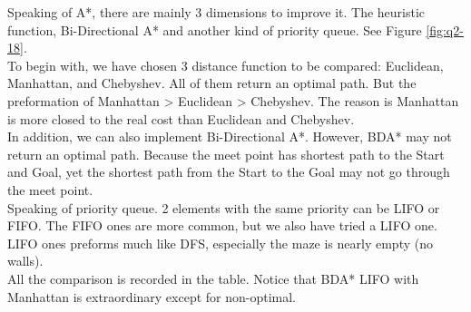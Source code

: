 \documentclass[letter]{article}
\begin{document}
\begin{questions}
	Speaking of A*, there are mainly 3 dimensions to improve it. The heuristic function, Bi-Directional A* and another kind of priority queue. See Figure \ref{fig:q2-18}.\\
	
	To begin with, we have chosen 3 distance function to be compared: Euclidean, Manhattan, and Chebyshev. All of them return an optimal path. But the preformation of Manhattan > Euclidean > Chebyshev. The reason is Manhattan is more closed to the real cost than Euclidean and Chebyshev. \\
	
	In addition, we can also implement Bi-Directional A*. However, BDA* may not return an optimal path. Because the meet point has shortest path to the Start and Goal, yet the shortest path from the Start to the Goal may not go through the meet point. \\
	
	Speaking of priority queue. 2 elements with the same priority can be LIFO or FIFO. The FIFO ones are more common, but we also have tried a LIFO one. LIFO ones preforms much like DFS, especially the maze is nearly empty (no walls). \\
	
	All the comparison is recorded in the table. Notice that BDA* LIFO with Manhattan is extraordinary except for non-optimal. \\
	

\end{questions}
\end{document}
